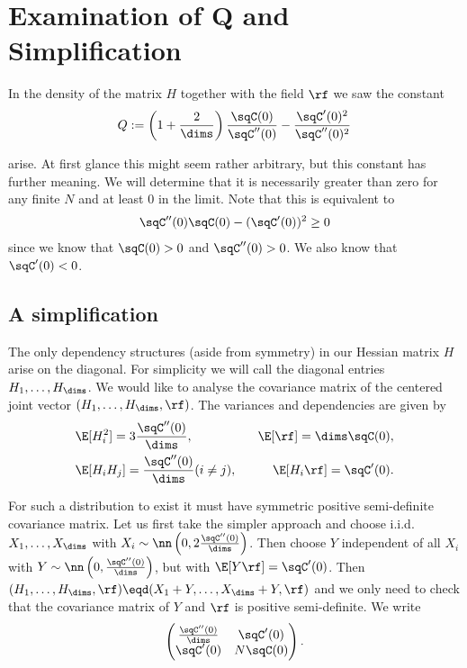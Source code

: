 
\section{Examination of Q and Simplification}

In the density of the matrix $H$ together with the field $\rf$ we saw the constant
\begin{align*}
    Q := \left(1+\frac2\dims\right)
    \frac{\sqC(0)}{\sqC''(0)} - \frac{\sqC'(0)^2}{\sqC''(0)^2}
\end{align*}

arise. At first glance this might seem rather arbitrary, but this constant has further meaning. We will determine that it is necessarily greater than zero for any finite $N$ and at least $0$ in the limit. Note that this is equivalent to 
\begin{align*}
    \sqC''(0)\sqC(0) - (\sqC'(0))^2 \geq 0
\end{align*}
since we know that $\sqC(0) > 0$ and $\sqC''(0) > 0$. We also know that $\sqC'(0)<0$.

\subsection{A simplification}

The only dependency structures (aside from symmetry) in our Hessian matrix $H$ arise on the diagonal. For simplicity we will call the diagonal entries $H_1, \ldots, H_\dims$. We would like to analyse the covariance matrix of the centered joint vector $(H_1, \ldots, H_\dims, \rf)$. The variances and dependencies are given by 
\begin{eqnarray*}
    &\E[H_i^2] = 3\frac{\sqC''(0)}{\dims}, \qquad &\E[\rf] = \dims \sqC(0), \\
    &\E[H_i H_j] = \frac{\sqC''(0)}{\dims} (i \neq j), &\qquad \E[H_i \rf] = \sqC'(0).
\end{eqnarray*}

For such a distribution to exist it must have symmetric positive semi-definite covariance matrix. Let us first take the simpler approach and choose i.i.d. $X_1, \ldots, X_\dims$ with $X_i \sim \nn\left(0,2\frac{\sqC''(0)}{\dims}\right)$. Then choose $Y$ independent of all $X_i$ with $Y \sim \nn\left(0,\frac{\sqC''(0)}{\dims}\right)$, but with $\E[Y \rf] = \sqC'(0)$. Then $(H_1, \ldots, H_\dims,\rf) \eqd (X_1 + Y, \ldots, X_\dims + Y,\rf)$ and we only need to check that the covariance matrix of $Y$ and $\rf$ is positive semi-definite. We write
\begin{align*}
    \begin{pmatrix}
        \frac{\sqC''(0)}{\dims} & \sqC'(0) \\
        \sqC'(0) & N \sqC(0)
    \end{pmatrix}.
\end{align*}

